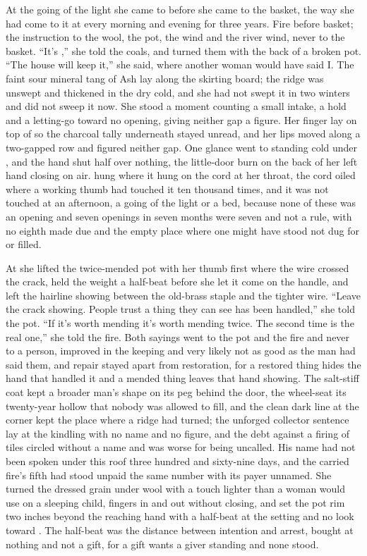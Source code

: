 \scenebreak

At the going of the light she came to  before she came to the basket, the way she had come to it at every morning and evening for three years. Fire before basket; the instruction to the wool, the pot, the wind and the river wind, never to the basket. “It's ,” she told the coals, and turned them with the back of a broken pot. “The house will keep it,” she said, where another woman would have said I. The faint sour mineral tang of Ash lay along the skirting board; the ridge was unswept and thickened in the dry cold, and she had not swept it in two winters and did not sweep it now. She stood a moment counting a small intake, a hold and a letting-go toward no opening, giving neither gap a figure. Her finger lay on top of  so the charcoal tally underneath stayed unread, and her lips moved along a two-gapped row and figured neither gap. One glance went to  standing cold under , and the hand shut half over nothing, the little-door burn on the back of her left hand closing on air.  hung where it hung on the cord at her throat, the cord oiled where a working thumb had touched it ten thousand times, and it was not touched at an afternoon, a going of the light or a bed, because none of these was an opening and seven openings in seven months were seven and not a rule, with no eighth made due and the empty place where one might have stood not dug for or filled.

At  she lifted the twice-mended pot with her thumb first where the wire crossed the crack, held the weight a half-beat before she let it come on the handle, and left the hairline showing between the old-brass staple and the tighter wire. “Leave the crack showing. People trust a thing they can see has been handled,” she told the pot. “If it's worth mending it's worth mending twice. The second time is the real one,” she told the fire. Both sayings went to the pot and the fire and never to a person, improved in the keeping and very likely not as good as the man had said them, and repair stayed apart from restoration, for a restored thing hides the hand that handled it and a mended thing leaves that hand showing. The salt-stiff coat kept a broader man's shape on its peg behind the door, the wheel-seat its twenty-year hollow that nobody was allowed to fill, and the clean dark line at the corner kept the place where a ridge had turned; the unforged collector sentence lay at the kindling with no name and no figure, and the debt against a firing of tiles circled without a name and was worse for being uncalled. His name had not been spoken under this roof three hundred and sixty-nine days, and the carried fire's fifth had stood unpaid the same number with its payer unnamed. She turned the dressed grain under wool with a touch lighter than a woman would use on a sleeping child, fingers in and out without closing, and set the pot rim two inches beyond the reaching hand with a half-beat at the setting and no look toward . The half-beat was the distance between intention and arrest, bought at nothing and not a gift, for a gift wants a giver standing and none stood.

